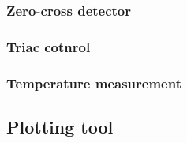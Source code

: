 \subsubsection{Zero-cross detector}
\subsubsection{Triac cotnrol}
\subsubsection{Temperature measurement}
\subsection{Plotting tool}
